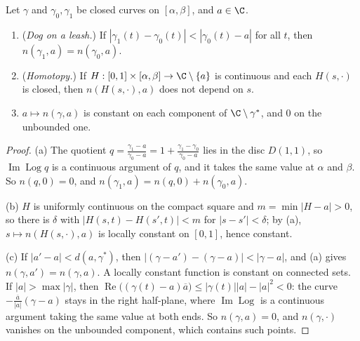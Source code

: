 \begin{proposition}\label{prop:windingprops}
Let $\gamma$ and $\gamma_0,\gamma_1$ be closed curves on $[\alpha,\beta]$, and $a\in\C$.
\begin{enumerate}
\item[(a)] (\emph{Dog on a leash.}) If $|\gamma_1(t)-\gamma_0(t)|<|\gamma_0(t)-a|$ for all $t$, then $n(\gamma_1,a)=n(\gamma_0,a)$.
\item[(b)] (\emph{Homotopy.}) If $H:[0,1]\times[\alpha,\beta]\to\C\setminus\{a\}$ is continuous and each $H(s,\cdot)$ is closed, then $n(H(s,\cdot),a)$ does not depend on $s$.
\item[(c)] $a\mapsto n(\gamma,a)$ is constant on each component of $\C\setminus\gamma^*$, and $0$ on the unbounded one.
\end{enumerate}
\end{proposition}
\begin{proof}
(a) The quotient $q=\frac{\gamma_1-a}{\gamma_0-a}=1+\frac{\gamma_1-\gamma_0}{\gamma_0-a}$ lies in the disc $D(1,1)$, so $\operatorname{Im}\operatorname{Log}q$ is a continuous argument of $q$, and it takes the same
value at $\alpha$ and $\beta$. So $n(q,0)=0$, and $n(\gamma_1,a)=n(q,0)+n(\gamma_0,a)$.

(b) $H$ is uniformly continuous on the compact square and $m=\min|H-a|>0$, so there is $\delta$ with $|H(s,t)-H(s',t)|<m$ for $|s-s'|<\delta$; by (a), $s\mapsto n(H(s,\cdot),a)$ is
locally constant on $[0,1]$, hence constant.

(c) If $|a'-a|<d(a,\gamma^*)$, then $|(\gamma-a')-(\gamma-a)|<|\gamma-a|$, and (a) gives $n(\gamma,a')=n(\gamma,a)$. A locally constant function is constant on connected sets. If
$|a|>\max|\gamma|$, then $\operatorname{Re}\bigl((\gamma(t)-a)\overline a\bigr)\le|\gamma(t)||a|-|a|^2<0$: the curve $-\frac{\overline a}{|a|}(\gamma-a)$ stays in the right half-plane, where
$\operatorname{Im}\operatorname{Log}$ is a continuous argument taking the same value at both ends. So $n(\gamma,a)=0$, and $n(\gamma,\cdot)$ vanishes on the unbounded component, which contains such points.
\end{proof}

